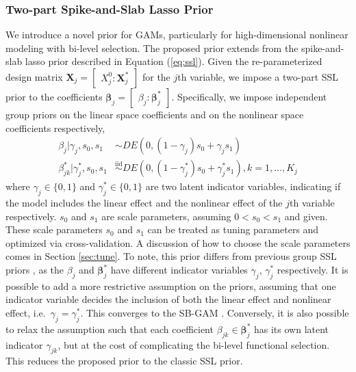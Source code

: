 \documentclass[AMA,STIX1COL,]{WileyNJD-v2}
\begin{document}
\hypertarget{two-part-spike-and-slab-lasso-prior}{%
\subsubsection{Two-part Spike-and-Slab Lasso
Prior}\label{two-part-spike-and-slab-lasso-prior}}

We introduce a novel prior for GAMs, particularly for high-dimensional
nonlinear modeling with bi-level selection. The proposed prior extends
from the spike-and-slab lasso prior described in Equation
(\ref{eq:ssl}). Given the re-parameterized design matrix
\(\boldsymbol{X}_j = \begin{bmatrix} X^0_j : \boldsymbol{X}_j^*\end{bmatrix}\)
for the \(j\)th variable, we impose a two-part SSL prior to the
coefficients
\(\boldsymbol{\beta}_j = \begin{bmatrix} \beta_j : \boldsymbol{\beta}_j^*\end{bmatrix}\).
Specifically, we impose independent group priors on the linear space
coefficients and on the nonlinear space coefficients respectively,
\begin{align}\label{eq:bham_ssl}
  \beta_{j} |\gamma_{j},s_0,s_1 &\sim DE(0,(1-\gamma_{j}) s_0 + \gamma_{j} s_1) \nonumber \\
  \beta^*_{jk} | \gamma^*_{j},s_0,s_1 &\overset{\text{iid}}{\sim}DE(0,(1-\gamma^*_{j}) s_0 + \gamma^*_{j} s_1), k=1,\dots, K_j
\end{align} where \(\gamma_{j}\in\{0,1\}\) and
\(\gamma^*_{j}\in \{0,1\}\) are two latent indicator variables,
indicating if the model includes the linear effect and the nonlinear
effect of the \(j\)th variable respectively. \(s_0\) and \(s_1\) are
scale parameters, assuming \(0 < s_0 < s_1\) and given. These scale
parameters \(s_0\) and \(s_1\) can be treated as tuning parameters and
optimized via cross-validation. A discussion of how to choose the scale
parameters comes in Section \ref{sec:tune}. To note, this prior differs
from previous group SSL priors \citep{Tang2018, Tang2019}, as the
\(\beta_j\) and \(\boldsymbol{\beta}^*_j\) have different indicator
variables \(\gamma_j\), \(\gamma_j^*\) respectively. It is possible to
add a more restrictive assumption on the priors, assuming that one
indicator variable decides the inclusion of both the linear effect and
nonlinear effect, i.e.~\(\gamma_j = \gamma^*_j\). This converges to the
SB-GAM \citep{Bai2021}. Conversely, it is also possible to relax the
assumption such that each coefficient
\(\beta_{jk} \in \boldsymbol{\beta}^*_j\) has its own latent indicator
\(\gamma_{jk}\), but at the cost of complicating the bi-level functional
selection. This reduces the proposed prior to the classic SSL prior.
\end{document}
